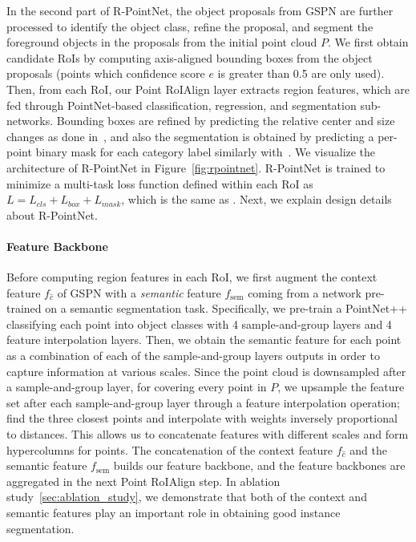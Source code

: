 \documentclass[10pt,twocolumn,letterpaper]{article}
\begin{document}
In the second part of R-PointNet, the object proposals from GSPN are further processed to identify the object class, refine the proposal, and segment the foreground objects in the proposals from the initial point cloud $P$.
We first obtain candidate RoIs by computing axis-aligned bounding boxes from the object proposals (points which confidence score $e$ is greater than 0.5 are only used). Then, from each RoI, our Point RoIAlign layer extracts region features, which are fed through PointNet-based classification, regression, and segmentation sub-networks.
Bounding boxes are refined by predicting the relative center and size changes as done in~\cite{ren2015faster}, and also the segmentation is obtained by predicting a per-point binary mask for each category label similarly with~\cite{he2017mask}.
We visualize the architecture of R-PointNet in Figure~\ref{fig:rpointnet}. R-PointNet is trained to minimize a multi-task loss function defined within each RoI as $L=L_{cls}+L_{box}+L_{mask}$, which is the same as \cite{he2017mask}. Next, we explain design details about R-PointNet.



\vspace{-\baselineskip}
\paragraph{Feature Backbone}
Before computing region features in each RoI, we first augment the context feature $f_{\hat{c}}$ of GSPN with a \emph{semantic} feature $f_{\text{sem}}$ coming from a network pre-trained on a semantic segmentation task. Specifically, we pre-train a PointNet++ classifying each point into object classes with 4 sample-and-group layers and 4 feature interpolation layers. Then, we obtain the semantic feature for each point as a combination of each of the sample-and-group layers outputs in order to capture information at various scales.
Since the point cloud is downsampled after a sample-and-group layer, for covering every point in $P$, we upsample the feature set after each sample-and-group layer through a feature interpolation operation; find the three closest points and interpolate with weights inversely proportional to distances. This allows us to concatenate features with different scales and form hypercolumns \cite{hariharan2015hypercolumns} for points. The concatenation of the context feature $f_{\hat{c}}$ and the semantic feature $f_{\text{sem}}$ builds our feature backbone, and the feature backbones are aggregated in the next Point RoIAlign step. In ablation study~\ref{sec:ablation_study}, we demonstrate that both of the context and semantic features play an important role in obtaining good instance segmentation.
\end{document}
